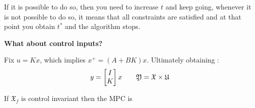 If it is possible to do so, then you need to increase $t$ and keep going, whenever it is not possible to do so, it means that all constraints are satisfied and at that point you obtain $t^*$ and the algorithm stops.

\begin{center}
\textbf{What about control inputs?}
\end{center}


Fix $u= Kx$, which implies $x^+ = (A+BK)x$. Ultimately obtaining :
\[y = \begin{bmatrix}I\\K\end{bmatrix}x\qquad\mathfrak{Y} = \mathfrak{X}\times\mathfrak{U}\]

\begin{theorem}
If $\mathfrak{X}_f$ is control invariant then the MPC is 
\end{theorem}

